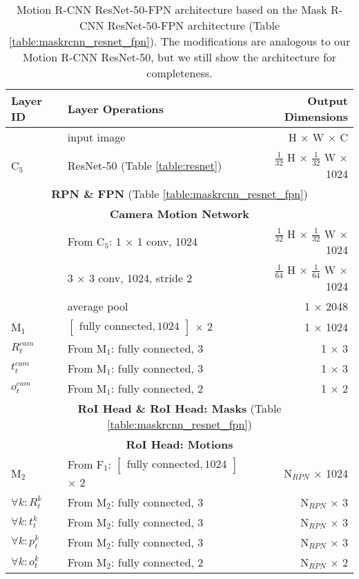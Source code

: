 {
\begin{table}[h]
\centering
\begin{tabular}{llr}
\toprule
\textbf{Layer ID} & \textbf{Layer Operations} & \textbf{Output Dimensions} \\
\midrule\midrule
& input image & H $\times$ W $\times$ C \\
\midrule
C$_5$ & ResNet-50 (Table \ref{table:resnet}) & $\tfrac{1}{32}$ H $\times$ $\tfrac{1}{32}$ W $\times$ 1024 \\
\midrule
\multicolumn{3}{c}{\textbf{RPN \& FPN} (Table \ref{table:maskrcnn_resnet_fpn})} \\
\midrule
\multicolumn{3}{c}{\textbf{Camera Motion Network}}\\
\midrule
& From C$_5$: 1 $\times$ 1 conv, 1024 & $\tfrac{1}{32}$ H $\times$ $\tfrac{1}{32}$ W $\times$ 1024 \\
& 3 $\times$ 3 conv, 1024, stride 2 & $\tfrac{1}{64}$ H $\times$ $\tfrac{1}{64}$ W $\times$ 1024 \\
& average pool & 1 $\times$ 2048 \\
M$_1$ & $\begin{bmatrix}\textrm{fully connected}, 1024\end{bmatrix}$ $\times$ 2  & 1 $\times$ 1024 \\
$R_t^{cam}$& From M$_1$: fully connected, 3 & 1 $\times$ 3 \\
$t_t^{cam}$& From M$_1$: fully connected, 3 & 1 $\times$ 3 \\
$o_t^{cam}$& From M$_1$: fully connected, 2 & 1 $\times$ 2 \\
\midrule
\multicolumn{3}{c}{\textbf{RoI Head \& RoI Head: Masks} (Table \ref{table:maskrcnn_resnet_fpn})} \\
\midrule
\multicolumn{3}{c}{\textbf{RoI Head: Motions}}\\
\midrule
M$_2$ & From F$_1$: $\begin{bmatrix}\textrm{fully connected}, 1024\end{bmatrix}$ $\times$ 2 & N$_{RPN}$ $\times$ 1024 \\
$\forall k: R_t^k$ & From M$_2$: fully connected, 3 & N$_{RPN}$ $\times$ 3 \\
$\forall k: t_t^k$ & From M$_2$: fully connected, 3 & N$_{RPN}$ $\times$ 3 \\
$\forall k: p_t^k$ & From M$_2$: fully connected, 3 & N$_{RPN}$ $\times$ 3 \\
$\forall k: o_t^k$ & From M$_2$: fully connected, 2 & N$_{RPN}$ $\times$ 2 \\

\bottomrule
\end{tabular}

\caption {
Motion R-CNN ResNet-50-FPN architecture based on the Mask R-CNN
ResNet-50-FPN architecture (Table \ref{table:maskrcnn_resnet_fpn}).
The modifications are analogous to our Motion R-CNN ResNet-50,
but we still show the architecture for completeness.
}
\label{table:motionrcnn_resnet_fpn}
\end{table}
}

